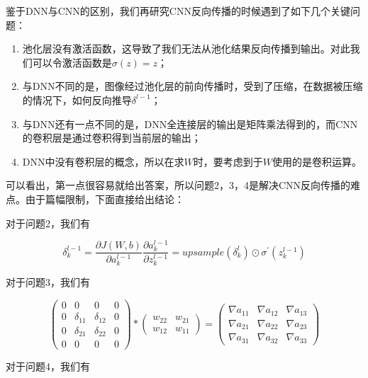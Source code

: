 鉴于DNN与CNN的区别，我们再研究CNN反向传播的时候遇到了如下几个关键问题：

\begin{enumerate}
\item 池化层没有激活函数，这导致了我们无法从池化结果反向传播到输出。对此我们可以令激活函数是$\sigma(z) = z$；

\item 与DNN不同的是，图像经过池化层的前向传播时，受到了压缩，在数据被压缩的情况下，如何反向推导$\delta^{l-1}$；

\item 与DNN还有一点不同的是，DNN全连接层的输出是矩阵乘法得到的，而CNN的卷积层是通过卷积得到当前层的输出；

\item DNN中没有卷积层的概念，所以在求$W$时，要考虑到于$W$使用的是卷积运算。
\end{enumerate}

可以看出，第一点很容易就给出答案，所以问题2，3，4是解决CNN反向传播的难点。由于篇幅限制，下面直接给出结论：

对于问题2，我们有

\begin{equation}
\label{eq:6}
\delta_k^{l-1} = \frac{\partial J(W,b)}{\partial a_k^{l-1}} \frac{\partial  a_k^{l-1}}{\partial z_k^{l-1}} = upsample(\delta_k^l) \odot \sigma^{'}(z_k^{l-1})
\end{equation}

对于问题3，我们有

\begin{equation}
\label{eq:7}
\left( \begin{array}{cccc} 0&0&0&0 \\ 0&\delta_{11}& \delta_{12}&0 \\ 0&\delta_{21}&\delta_{22}&0 \\ 0&0&0&0 \end{array} \right) * \left( \begin{array}{ccc} w_{22}&w_{21}\\ w_{12}&w_{11} \end{array} \right)  = \left( \begin{array}{ccc} \nabla a_{11}&\nabla a_{12}&\nabla a_{13} \\ \nabla a_{21}&\nabla a_{22}&\nabla a_{23}\\ \nabla a_{31}&\nabla a_{32}&\nabla a_{33} \end{array} \right)
\end{equation}

对于问题4，我们有


